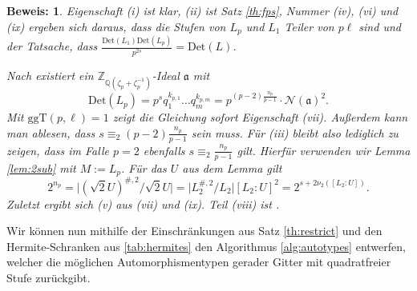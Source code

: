 \documentclass[12pt,a4paper,halfparskip,headsepline,bibtotocnumbered]{scrreprt}
\theoremstyle{nummermitklammern}
\theoremstyle{nonumberbreak}
\newtheorem{beweis}{Beweis:}
\newcommand{\Z}{\mathbb{Z}}
\newcommand{\Q}{\mathbb{Q}}
\newcommand{\No}{\mathcal{N}}
\newcommand{\Det}{\text{Det}}
\renewcommand{\a}{\mathfrak{a}}
\newcommand{\ggT}{\text{ggT}}
\begin{document}
\begin{beweis}
	Eigenschaft (i) ist klar, (ii) ist Satz \eqref{th:fps}, Nummer (iv), (vi) und (ix) ergeben sich daraus, dass die Stufen von $L_p$ und $L_1$ Teiler von $p \ell$ sind und der Tatsache, dass $\frac{\Det(L_1) \Det(L_p)}{p^{2s}} = \Det(L)$.\par
	Nach \cite[Satz (3.1.4)(d) und Lemma (3.1.1)]{juergens} existiert ein $\Z_{\Q(\zeta_p + \zeta_p^{-1})}$-Ideal $\a$ mit
	\begin{equation*}
		\Det(L_p) = p^s q_1^{k_{p,1}} \dots q_m^{k_{p,m}} = p^{(p-2)\frac{n_p}{p-1}} \cdot \No(\a)^2.
	\end{equation*}
	Mit $\ggT(p, \ell) = 1$ zeigt die Gleichung sofort Eigenschaft (vii). Außerdem kann man ablesen, dass $s \equiv_2 (p-2)\frac{n_p}{p-1}$ sein muss. Für (iii) bleibt also lediglich zu zeigen, dass im Falle $p=2$ ebenfalls $s \equiv_2 \frac{n_p}{p-1}$ gilt. Hierfür verwenden wir Lemma \eqref{lem:2sub} mit $M := L_p$. Für das $U$ aus dem Lemma gilt
	\begin{equation*}
		2^{n_p} = \vert (\sqrt{2}U)^{\#,2} / \sqrt{2} U \vert = \vert L_2^{\#,2} / L_2 \vert [L_2 : U]^2 = 2^{s + 2 \nu_2([L_2 : U])}.
	\end{equation*}
	Zuletzt ergibt sich (v) aus (vii) und (ix). Teil (viii) ist \cite[Korollar (4.1.9)]{juergens}.
\end{beweis}

Wir können nun mithilfe der Einschränkungen aus Satz \eqref{th:restrict} und den Hermite-Schranken aus \eqref{tab:hermites} den Algorithmus \eqref{alg:autotypes} entwerfen, welcher die möglichen Automorphismentypen gerader Gitter mit quadratfreier Stufe zurückgibt.
\end{document}
